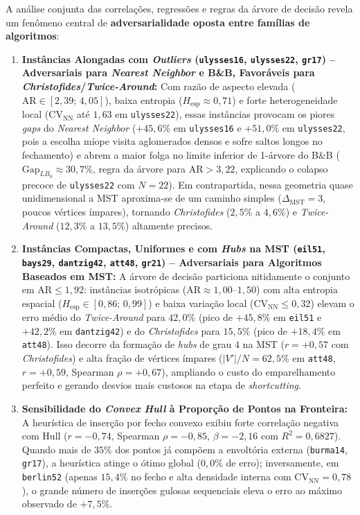 A análise conjunta das correlações, regressões e regras da árvore de decisão revela um fenômeno central de \textbf{adversarialidade oposta entre famílias de algoritmos}:

\begin{enumerate}
    \item \textbf{Instâncias Alongadas com \textit{Outliers} (\texttt{ulysses16}, \texttt{ulysses22}, \texttt{gr17}) -- Adversariais para \textit{Nearest Neighbor} e B\&B, Favoráveis para \textit{Christofides}/\textit{Twice-Around}:} Com razão de aspecto elevada ($\mathrm{AR} \in [2{,}39;\, 4{,}05]$), baixa entropia ($H_{\text{esp}} \approx 0{,}71$) e forte heterogeneidade local ($\mathrm{CV}_{\text{NN}}$ até $1{,}63$ em \texttt{ulysses22}), essas instâncias provocam os piores \textit{gaps} do \textit{Nearest Neighbor} ($+45{,}6\%$ em \texttt{ulysses16} e $+51{,}0\%$ em \texttt{ulysses22}, pois a escolha míope visita aglomerados densos e sofre saltos longos no fechamento) e abrem a maior folga no limite inferior de 1-árvore do B\&B ($\mathrm{Gap}_{LB_0} \approx 30{,}7\%$, regra da árvore para $\mathrm{AR} > 3{,}22$, explicando o colapso precoce de \texttt{ulysses22} com $N=22$). Em contrapartida, nessa geometria quase unidimensional a MST aproxima-se de um caminho simples ($\Delta_{\text{MST}}=3$, poucos vértices ímpares), tornando \textit{Christofides} ($2{,}5\%$ a $4{,}6\%$) e \textit{Twice-Around} ($12{,}3\%$ a $13{,}5\%$) altamente precisos.
    \item \textbf{Instâncias Compactas, Uniformes e com \textit{Hubs} na MST (\texttt{eil51}, \texttt{bays29}, \texttt{dantzig42}, \texttt{att48}, \texttt{gr21}) -- Adversariais para Algoritmos Baseados em MST:} A árvore de decisão particiona nitidamente o conjunto em $\mathrm{AR} \le 1{,}92$: instâncias isotrópicas ($\mathrm{AR} \approx 1{,}00$--$1{,}50$) com alta entropia espacial ($H_{\text{esp}} \in [0{,}86;\, 0{,}99]$) e baixa variação local ($\mathrm{CV}_{\text{NN}} \le 0{,}32$) elevam o erro médio do \textit{Twice-Around} para $42{,}0\%$ (pico de $+45{,}8\%$ em \texttt{eil51} e $+42{,}2\%$ em \texttt{dantzig42}) e do \textit{Christofides} para $15{,}5\%$ (pico de $+18{,}4\%$ em \texttt{att48}). Isso decorre da formação de \textit{hubs} de grau $4$ na MST ($r=+0{,}57$ com \textit{Christofides}) e alta fração de vértices ímpares ($|V'|/N = 62{,}5\%$ em \texttt{att48}, $r=+0{,}59$, Spearman $\rho=+0{,}67$), ampliando o custo do emparelhamento perfeito e gerando desvios mais custosos na etapa de \textit{shortcutting}.
    \item \textbf{Sensibilidade do \textit{Convex Hull} à Proporção de Pontos na Fronteira:} A heurística de inserção por fecho convexo exibiu forte correlação negativa com $\mathrm{Hull}$ ($r=-0{,}74$, Spearman $\rho=-0{,}85$, $\beta=-2{,}16$ com $R^2=0{,}6827$). Quando mais de $35\%$ dos pontos já compõem a envoltória externa (\texttt{burma14}, \texttt{gr17}), a heurística atinge o ótimo global ($0{,}0\%$ de erro); inversamente, em \texttt{berlin52} (apenas $15{,}4\%$ no fecho e alta densidade interna com $\mathrm{CV}_{\text{NN}}=0{,}78$), o grande número de inserções gulosas sequenciais eleva o erro ao máximo observado de $+7{,}5\%$.
\end{enumerate}

